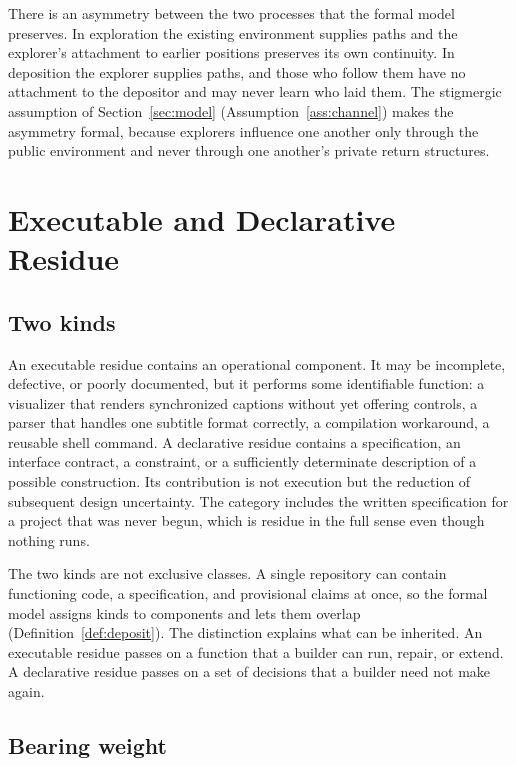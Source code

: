 \documentclass[11pt]{article}
\theoremstyle{definition}
\theoremstyle{remark}
\begin{document}
There is an asymmetry between the two processes that the formal model preserves. In exploration the existing environment supplies paths and the explorer's attachment to earlier positions preserves its own continuity. In deposition the explorer supplies paths, and those who follow them have no attachment to the depositor and may never learn who laid them. The stigmergic assumption of Section~\ref{sec:model} (Assumption~\ref{ass:channel}) makes the asymmetry formal, because explorers influence one another only through the public environment and never through one another's private return structures.

\section{Executable and Declarative Residue}\label{sec:residue}

\subsection{Two kinds}

An executable residue contains an operational component. It may be incomplete, defective, or poorly documented, but it performs some identifiable function: a visualizer that renders synchronized captions without yet offering controls, a parser that handles one subtitle format correctly, a compilation workaround, a reusable shell command. A declarative residue contains a specification, an interface contract, a constraint, or a sufficiently determinate description of a possible construction. Its contribution is not execution but the reduction of subsequent design uncertainty. The category includes the written specification for a project that was never begun, which is residue in the full sense even though nothing runs.

The two kinds are not exclusive classes. A single repository can contain functioning code, a specification, and provisional claims at once, so the formal model assigns kinds to components and lets them overlap (Definition~\ref{def:deposit}). The distinction explains what can be inherited. An executable residue passes on a function that a builder can run, repair, or extend. A declarative residue passes on a set of decisions that a builder need not make again.

\subsection{Bearing weight}
\end{document}
